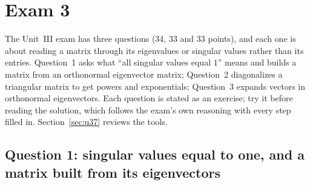 \section{Exam 3}\label{sec:u38}

The Unit~III exam has three questions (34, 33 and 33 points), and each one is about reading a matrix through its eigenvalues or singular values rather than its entries. Question~1 asks what ``all singular values equal $1$'' means and builds a matrix from an orthonormal eigenvector matrix; Question~2 diagonalizes a triangular matrix to get powers and exponentials; Question~3 expands vectors in orthonormal eigenvectors. Each question is stated as an exercise; try it before reading the solution, which follows the exam's own reasoning with every step filled in. Section~\ref{sec:u37} reviews the tools.

\subsection{Question 1: singular values equal to one, and a matrix built from its eigenvectors}

